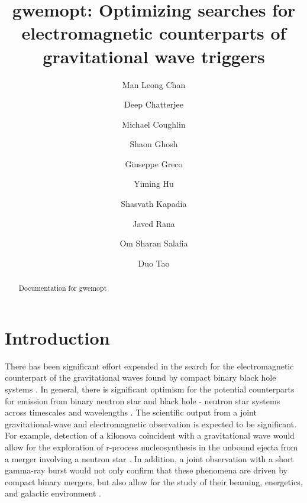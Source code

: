 \documentclass[twocolumn]{aastex61}
\begin{document}

\title{gwemopt: Optimizing searches for electromagnetic counterparts of gravitational wave triggers}

\author{Man Leong Chan}

\author{Deep Chatterjee}

\author{Michael Coughlin}

\author{Shaon Ghosh}

\author{Giuseppe Greco}

\author{Yiming Hu}

\author{Shasvath Kapadia}

\author{Javed Rana}

\author{Om Sharan Salafia}

\author{Duo Tao}

\begin{abstract}

Documentation for gwemopt

\end{abstract}


\section{Introduction}
\label{sec:Intro}

There has been significant effort expended in the search for the electromagnetic counterpart of the gravitational waves found by compact binary black hole systems \citep{AbEA2016a,AbEA2016g,AbEA2017}.
In general, there is significant optimism for the potential counterparts for emission from binary neutron star and black hole - neutron star systems across timescales and wavelengths \citep{Nakar2007,MeBe2012}. 
The scientific output from a joint gravitational-wave and electromagnetic observation is expected to be significant. For example, detection of a kilonova coincident with a gravitational wave would allow for the exploration of r-process nucleosynthesis in the unbound ejecta from a merger involving a neutron star \cite{MeBa2015}.
In addition, a joint observation with a short gamma-ray burst would not only confirm that these phenomena are driven by compact binary mergers, but also allow for the study of their beaming, energetics, and galactic environment \cite{MeBe2012}.
\end{document}
